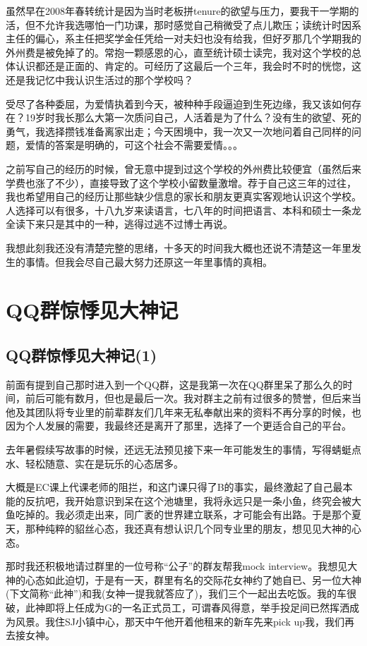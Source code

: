 \documentclass[12pt]{book}
\begin{document}
虽然早在2008年春转统计是因为当时老板拼tenure的欲望与压力，要我干一学期的活，但不允许我选哪怕一门功课，那时感觉自己稍微受了点儿欺压；读统计时因系主任的偏心，系主任把奖学金任凭给一对夫妇也没有给我，但好歹那几个学期我的外州费是被免掉了的。常抱一颗感恩的心，直至统计硕士读完，我对这个学校的总体认识都还是正面的、肯定的。可经历了这最后一个三年，我会时不时的恍惚，这还是我记忆中我认识生活过的那个学校吗？

受尽了各种委屈，为爱情执着到今天，被种种手段逼迫到生死边缘，我又该如何存在？19岁时我长那么大第一次质问自己，人活着是为了什么？没有生的欲望、死的勇气，我选择攒钱准备离家出走；今天困境中，我一次又一次地问着自己同样的问题，爱情的答案是明确的，可这个社会不需要爱情。。。

之前写自己的经历的时候，曾无意中提到过这个学校的外州费比较便宜（虽然后来学费也涨了不少），直接导致了这个学校小留数量激增。荐于自己这三年的过往，我也希望用自己的经历让那些缺少信息的家长和朋友更真实客观地认识这个学校。人选择可以有很多，十八九岁来读语言，七八年的时间把语言、本科和硕士一条龙全读下来只是其中的一种，逃得过逃不过博士再说。

我想此刻我还没有清楚完整的思绪，十多天的时间我大概也还说不清楚这一年里发生的事情。但我会尽自己最大努力还原这一年里事情的真相。

\chapter{QQ群惊悸见大神记}
\label{sec-3}
\section{QQ群惊悸见大神记(1)}
\label{sec-3-1}

前面有提到自己那时进入到一个QQ群，这是我第一次在QQ群里呆了那么久的时间，前后可能有数月，但也是最后一次。我对群主之前有过很多的赞誉，但后来当他及其团队将专业里的前辈群友们几年来无私奉献出来的资料不再分享的时候，也因为个人发展的需要，我最终还是离开了那里，选择了一个更适合自己的平台。 

去年暑假续写故事的时候，还远无法预见接下来一年可能发生的事情，写得蜻蜓点水、轻松随意、实在是玩乐的心态居多。 

大概是EC课上代课老师的阻拦，和这门课只得了B的事实，最终激起了自己最本能的反抗吧，我开始意识到呆在这个池塘里，我将永远只是一条小鱼，终究会被大鱼吃掉的。我必须走出来，同广袤的世界建立联系，才可能会有出路。于是那个夏天，那种纯粹的貂丝心态，我还真有想认识几个同专业里的朋友，想见见大神的心态。

那时我还积极地请过群里的一位号称“公子”的群友帮我mock interview。我想见大神的心态如此迫切，于是有一天，群里有名的交际花女神约了她自已、另一位大神(下文简称“此神”)和我(女神一提我就答应了)，我们三个一起出去吃饭。我的车很破，此神即将上任成为G的一名正式员工，可谓春风得意，举手投足间已然挥洒成为风景。我住SJ小镇中心，那天中午他开着他租来的新车先来pick up我，我们再去接女神。
\end{document}
